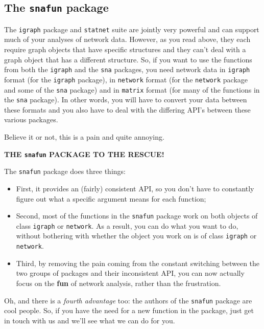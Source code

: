 \documentclass[
]{article}
\providecommand{\tightlist}{%
  \setlength{\itemsep}{0pt}\setlength{\parskip}{0pt}}
\begin{document}
\hypertarget{snafun-intro}{%
\subsection{\texorpdfstring{The \texttt{snafun}
package}{The snafun package}}\label{snafun-intro}}

The \texttt{igraph} package and \texttt{statnet} suite are jointly very
powerful and can support much of your analyses of network data. However,
as you read above, they each require graph objects that have specific
structures and they can't deal with a graph object that has a different
structure. So, if you want to use the functions from both the
\texttt{igraph} and the \texttt{sna} packages, you need network data in
\texttt{igraph} format (for the \texttt{igraph} package), in
\texttt{network} format (for the \texttt{network} package and some of
the \texttt{sna} package) and in \texttt{matrix} format (for many of the
functions in the \texttt{sna} package). In other words, you will have to
convert your data between these formats and you also have to deal with
the differing API's between these various packages.

Believe it or not, this is a pain and quite annoying.

\textbf{THE \texttt{snafun} PACKAGE TO THE RESCUE!}

The \texttt{snafun} package does three things:

\begin{itemize}
\tightlist
\item
  First, it provides an (fairly) consistent API, so you don't have to
  constantly figure out what a specific argument means for each
  function;
\item
  Second, most of the functions in the \texttt{snafun} package work on
  both objects of class \texttt{igraph} or \texttt{network}. As a
  result, you can do what you want to do, without bothering with whether
  the object you work on is of class \texttt{igraph} or
  \texttt{network}.
\item
  Third, by removing the pain coming from the constant switching between
  the two groups of packages and their inconsistent API, you can now
  actually focus on the \textbf{fun} of network analysis, rather than
  the frustration.
\end{itemize}

Oh, and there is a \emph{fourth advantage} too: the authors of the
\texttt{snafun} package are cool people. So, if you have the need for a
new function in the package, just get in touch with us and we'll see
what we can do for you.
\end{document}
